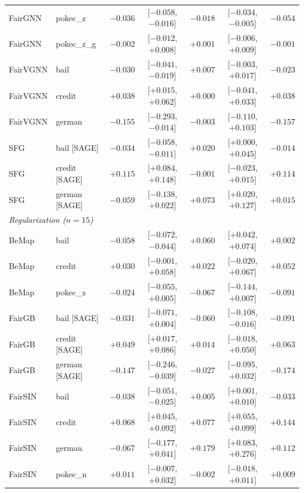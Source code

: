 \begin{table}[t]
\begin{tabular}{llrcrcr}
FairGNN & pokec\_z & $-0.036$ & [$-0.058$, $-0.016$] & $-0.018$ & [$-0.034$, $-0.005$] & $-0.054$ \\
FairGNN & pokec\_z\_g & $-0.002$ & [$-0.012$, $+0.008$] & $+0.001$ & [$-0.006$, $+0.009$] & $-0.001$ \\
\midrule
FairVGNN & bail & $-0.030$ & [$-0.041$, $-0.019$] & $+0.007$ & [$-0.003$, $+0.017$] & $-0.023$ \\
FairVGNN & credit & $+0.038$ & [$+0.015$, $+0.062$] & $+0.000$ & [$-0.041$, $+0.033$] & $+0.038$ \\
FairVGNN & german & $-0.155$ & [$-0.293$, $-0.014$] & $-0.003$ & [$-0.110$, $+0.103$] & $-0.157$ \\
\midrule
SFG & bail [SAGE] & $-0.034$ & [$-0.058$, $-0.011$] & $+0.020$ & [$+0.000$, $+0.045$] & $-0.014$ \\
SFG & credit [SAGE] & $+0.115$ & [$+0.084$, $+0.148$] & $-0.001$ & [$-0.023$, $+0.015$] & $+0.114$ \\
SFG & german [SAGE] & $-0.059$ & [$-0.138$, $+0.022$] & $+0.073$ & [$+0.020$, $+0.127$] & $+0.015$ \\
\midrule
\multicolumn{7}{l}{\textit{Regularization ($n=15$)}} \\
BeMap & bail & $-0.058$ & [$-0.072$, $-0.044$] & $\mathbf{+0.060}$ & [$+0.042$, $+0.074$] & $+0.002$ \\
BeMap & credit & $+0.030$ & [$-0.001$, $+0.058$] & $+0.022$ & [$-0.020$, $+0.067$] & $+0.052$ \\
BeMap & pokec\_z & $-0.024$ & [$-0.055$, $+0.005$] & $-0.067$ & [$-0.144$, $+0.007$] & $-0.091$ \\
\midrule
FairGB & bail [SAGE] & $-0.031$ & [$-0.071$, $+0.004$] & $-0.060$ & [$-0.108$, $-0.016$] & $-0.091$ \\
FairGB & credit [SAGE] & $+0.049$ & [$+0.017$, $+0.086$] & $+0.014$ & [$-0.018$, $+0.050$] & $+0.063$ \\
FairGB & german [SAGE] & $-0.147$ & [$-0.246$, $-0.039$] & $-0.027$ & [$-0.095$, $+0.032$] & $-0.174$ \\
\midrule
FairSIN & bail & $-0.038$ & [$-0.051$, $-0.025$] & $+0.005$ & [$+0.001$, $+0.010$] & $-0.033$ \\
FairSIN & credit & $+0.068$ & [$+0.045$, $+0.092$] & $\mathbf{+0.077}$ & [$+0.055$, $+0.099$] & $+0.144$ \\
FairSIN & german & $-0.067$ & [$-0.177$, $+0.041$] & $\mathbf{+0.179}$ & [$+0.083$, $+0.276$] & $+0.112$ \\
FairSIN & pokec\_n & $+0.011$ & [$-0.007$, $+0.032$] & $-0.002$ & [$-0.018$, $+0.011$] & $+0.009$ \\

\end{tabular}
\end{table}
